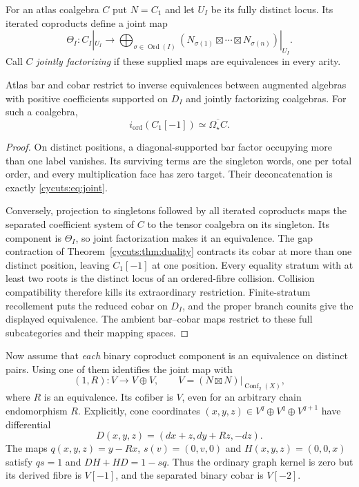 For an atlas coalgebra $C$ put $N=C_1$ and let $U_I$ be its
fully distinct locus. Its iterated coproducts define a joint map
\begin{equation}\label{cycuts:eq:joint}
 \Theta_I:C_I|_{U_I}\longrightarrow
 \bigoplus_{\sigma\in\operatorname{Ord}(I)}
       (N_{\sigma(1)}\boxtimes\cdots\boxtimes N_{\sigma(n)})|_{U_I}.
\end{equation}
Call $C$ \emph{jointly factorizing} if these supplied maps are
equivalences in every arity.

\begin{theorem}\label{cycuts:thm:joint}
Atlas bar and cobar restrict to inverse equivalences between augmented
algebras with positive coefficients supported on $D_I$ and jointly
factorizing coalgebras. For such a coalgebra,
\[
 i_{\mathrm{ord}}(C_1[-1])\simeq\overline{\Omega_\star C}.
\]
\end{theorem}
\begin{proof}
On distinct positions, a diagonal-supported bar factor occupying
more than one label vanishes. Its surviving terms are the singleton
words, one per total order, and every multiplication face has zero
target. Their deconcatenation is exactly \eqref{cycuts:eq:joint}.

Conversely, projection to singletons followed by all iterated
coproducts maps the separated coefficient system of $C$ to the
tensor coalgebra on its singleton. Its component is $\Theta_I$,
so joint factorization makes it an equivalence. The gap contraction
of Theorem~\ref{cycuts:thm:duality} contracts its cobar at more
than one distinct position, leaving $C_1[-1]$ at one position.
Every equality stratum with at least two roots is the distinct
locus of an ordered-fibre collision. Collision compatibility
therefore kills its extraordinary restriction. Finite-stratum
recollement puts the reduced cobar on $D_I$, and the proper branch
counits give the displayed equivalence. The ambient bar--cobar
maps restrict to these full subcategories and their mapping spaces.
\end{proof}

Now assume that \emph{each} binary coproduct component is an
equivalence on distinct pairs. Using one of them identifies the
joint map with
\[
 (1,R):V\longrightarrow V\oplus V,
 \qquad V=(N\boxtimes N)|_{\operatorname{Conf}_2(X)},
\]
where $R$ is an equivalence. Its cofiber is $V$, even for an
arbitrary chain endomorphism $R$. Explicitly, cone coordinates
$(x,y,z)\in V^q\oplus V^q\oplus V^{q+1}$ have differential
\[
 D(x,y,z)=(dx+z,dy+Rz,-dz).
\]
The maps $q(x,y,z)=y-Rx$, $s(v)=(0,v,0)$ and
$H(x,y,z)=(0,0,x)$ satisfy $qs=1$ and $DH+HD=1-sq$.
Thus the ordinary graph kernel is zero but its derived fibre is
$V[-1]$, and the separated binary cobar is $V[-2]$.

